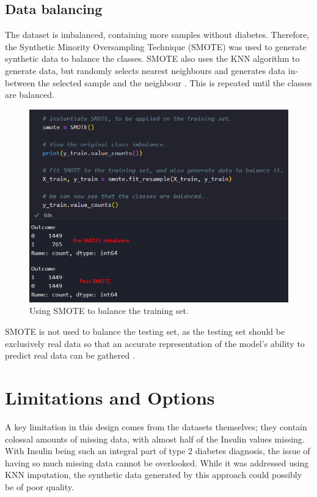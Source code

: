 \documentclass[12pt]{report}
\newcommand{\para}{\vspace{8pt}\noindent}
\begin{document}
\pagebreak

\subsection{Data balancing}
The dataset is imbalanced, containing more samples without diabetes. Therefore,
the Synthetic Minority Oversampling Technique (SMOTE) was used to generate synthetic data to balance the classes. 
SMOTE also uses the KNN algorithm to generate data, but randomly selects nearest neighbours and generates data in-between
the selected sample and the neighbour \autocite{trainindata_overcoming_2023}. This is repeated until the classes are balanced.

\begin{figure}[H]
    \centering
    \includegraphics[width=.8\linewidth]{Preprocessing/SMOTE.png}
    \caption{Using SMOTE to balance the training set.}
    \label{fig:SMOTE}
\end{figure}

\para SMOTE is not used to balance the testing set, as the testing set should be exclusively real data
so that an accurate representation of the model's ability to predict real data can be gathered \autocite{ozbun_properly_2021}.



\section{Limitations and Options}
A key limitation in this design comes from the datasets themselves; they contain colossal amounts of missing data, 
with almost half of the Insulin values missing. With Insulin being such an integral part of type 2 diabetes diagnosis,
the issue of having so much missing data cannot be overlooked. While it was addressed using KNN imputation, the synthetic 
data generated by this approach could possibly be of poor quality.
\end{document}
